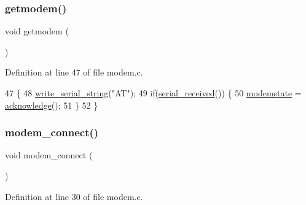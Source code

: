 \subsubsection{\texorpdfstring{getmodem()}{getmodem()}}
{\footnotesize\ttfamily void getmodem (\begin{DoxyParamCaption}{ }\end{DoxyParamCaption})}



Definition at line 47 of file modem.\+c.


\begin{DoxyCode}
47                 \{
48     \hyperlink{a00056_aabbe45d6670f606c53ba38a5fb14b650_aabbe45d6670f606c53ba38a5fb14b650}{write\_serial\_string}(\textcolor{stringliteral}{"AT"});
49     \textcolor{keywordflow}{if}(\hyperlink{a00056_af10f0e64ba89e8635aa7245ca08297c5_af10f0e64ba89e8635aa7245ca08297c5}{serial\_received}()) \{
50         \hyperlink{a00044_a0105e5654e7f0fa503f2853c88a2f782_a0105e5654e7f0fa503f2853c88a2f782}{modemstate} = \hyperlink{a00044_a8529dba543149138317e327931bf5a5c_a8529dba543149138317e327931bf5a5c}{acknowledge}();
51     \}
52 \}
\end{DoxyCode}
\mbox{\label{a00047_a283a7e4b715971478687b2d7547780cb_a283a7e4b715971478687b2d7547780cb}} 
\subsubsection{\texorpdfstring{modem\+\_\+connect()}{modem\_connect()}}
{\footnotesize\ttfamily void modem\+\_\+connect (\begin{DoxyParamCaption}{ }\end{DoxyParamCaption})}



Definition at line 30 of file modem.\+c.


